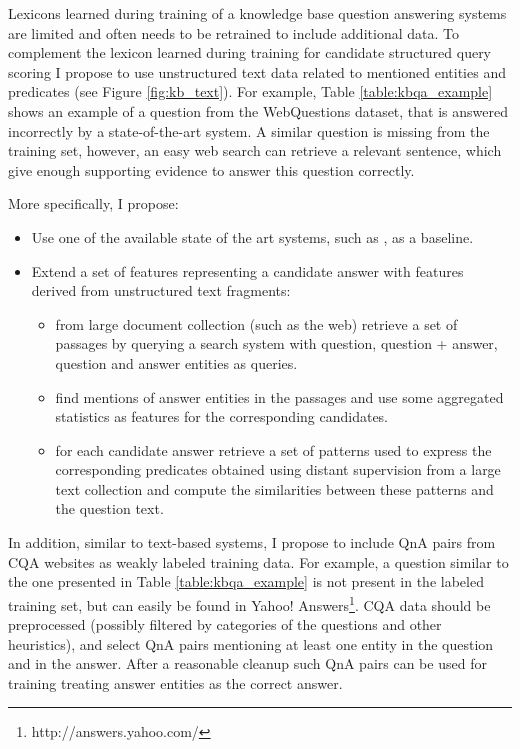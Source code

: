 Lexicons learned during training of a knowledge base question answering systems are limited and often needs to be retrained to include additional data.
To complement the lexicon learned during training for candidate structured query scoring I propose to use unstructured text data related to mentioned entities and predicates (see Figure \ref{fig:kb_text}).
For example, Table \ref{table:kbqa_example} shows an example of a question from the WebQuestions dataset, that is answered incorrectly by a state-of-the-art system.
A similar question is missing from the training set, however, an easy web search can retrieve a relevant sentence, which give enough supporting evidence to answer this question correctly.

More specifically, I propose:
\begin{itemize}
\item Use one of the available state of the art systems, such as \cite{bastmore:cikm:2015:aquu}, as a baseline.
\item Extend a set of features representing a candidate answer with features derived from unstructured text fragments:
	\begin{itemize}
	\item from large document collection (such as the web) retrieve a set of passages by querying a search system with question, question + answer, question and answer entities as queries.
	\item find mentions of answer entities in the passages and use some aggregated statistics as features for the corresponding candidates.
	\item for each candidate answer retrieve a set of patterns used to express the corresponding predicates obtained using distant supervision from a large text collection and compute the similarities between these patterns and the question text.
	\end{itemize}
\end{itemize}

In addition, similar to text-based systems, I propose to include QnA pairs from CQA websites as weakly labeled training data.
For example, a question similar to the one presented in Table \ref{table:kbqa_example} is not present in the labeled training set, but can easily be found in Yahoo! Answers\footnote{http://answers.yahoo.com/}.
CQA data should be preprocessed (possibly filtered by categories of the questions and other heuristics), and select QnA pairs mentioning at least one entity in the question and in the answer.
After a reasonable cleanup such QnA pairs can be used for training treating answer entities as the correct answer.

